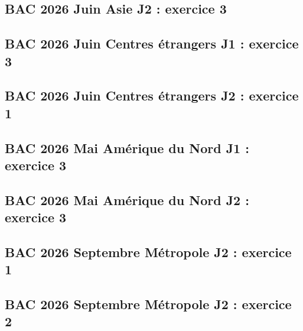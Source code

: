 \documentclass[lang=fr,edition=teacher,layout=sheet]{mxbook}
\begin{document}
\begingroup\endgroup
\par\bigskip
{}\subsection*{BAC 2026 Juin Asie J2 : exercice 3}
\begingroup\endgroup
\par\bigskip
{}\subsection*{BAC 2026 Juin Centres étrangers J1 : exercice 3}
\begingroup\endgroup
\par\bigskip
{}\subsection*{BAC 2026 Juin Centres étrangers J2 : exercice 1}
\begingroup\endgroup
\par\bigskip
{}\subsection*{BAC 2026 Mai Amérique du Nord J1 : exercice 3}
\begingroup\endgroup
\par\bigskip
{}\subsection*{BAC 2026 Mai Amérique du Nord J2 : exercice 3}
\begingroup\endgroup
\par\bigskip
{}\subsection*{BAC 2026 Septembre Métropole J2 : exercice 1}
\begingroup\endgroup
\par\bigskip
{}\subsection*{BAC 2026 Septembre Métropole J2 : exercice 2}
\end{document}
